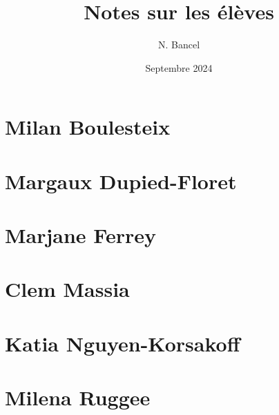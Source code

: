 \documentclass[a4paper,12pt]{article}
\begin{document}
\title{Notes sur les élèves}
\author{N. Bancel}
\date{Septembre 2024}
\maketitle

\section*{Milan Boulesteix}



\section*{Margaux Dupied-Floret}

\section*{Marjane  Ferrey}


\section*{Clem Massia}

\section*{Katia Nguyen-Korsakoff}

\section*{Milena Ruggee}
\end{document}
